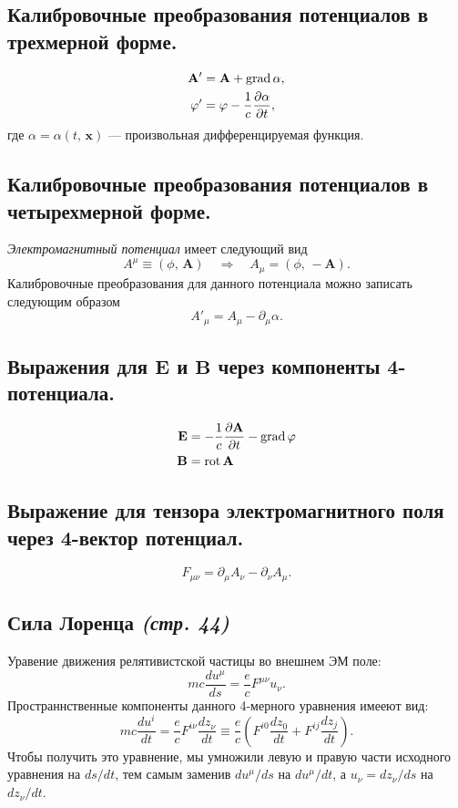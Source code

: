 \documentclass[a4paper,12pt]{article}
\begin{document}
\subsection{Калибровочные преобразования потенциалов в трехмерной форме.}
\begin{align*}
	\mathbf{A}'&=\mathbf{A}+\operatorname{grad} \alpha,\\
	\varphi'&=\varphi-\frac{1}{c}\frac{\partial \alpha}{\partial t} 
,\end{align*}
где $\alpha=\alpha(t,\,\mathbf{x})$ --- произвольная дифференцируемая функция.
\subsection{Калибровочные преобразования потенциалов в четырехмерной форме.}
\emph{Электромагнитный  потенциал} имеет следующий вид
\[
	A^\mu\equiv(\phi,\,\mathbf{A})\quad \Rightarrow\quad A_\mu=(\phi,\,-\mathbf{A})
.\]
Калибровочные преобразования для данного потенциала можно записать следующим
образом
\[
A'_\mu=A_\mu-\partial_\mu \alpha
.\] 
\subsection{Выражения для $\mathbf{E}$ и $\mathbf{B}$ через компоненты 4-потенциала.}
\begin{align*}
	\mathbf{E}&=-\frac{1}{c}\frac{\partial \mathbf{A}}{\partial t} -
	\operatorname{grad} \varphi\\
	\mathbf{B}&=\operatorname{rot} \mathbf{A}
\end{align*}
\subsection{Выражение для тензора электромагнитного поля через 4-вектор
потенциал.}
\[
F_{\mu\nu}=\partial_\mu A_\nu -\partial_\nu A_\mu
.\] 
\subsection{Сила Лоренца \emph{(стр. 44)}}
Уравение движения релятивистской частицы во внешнем ЭМ поле:
\[
	mc \frac{du^\mu}{ds}=\frac{e}{c}F^{\mu\nu}u_{\nu}
.\]
Пространнственные компоненты данного 4-мерного уравнения имееют вид:
\[
mc \frac{du^i}{dt}=\frac{e}{c}F^{i\nu} \frac{dz_\nu}{dt}\equiv
\frac{e}{c}\left( F^{i0} \frac{dz_0}{dt}+F^{ij}\frac{dz_j}{dt} \right) 
.\]
Чтобы получить это уравнение, мы умножили левую и правую части исходного
уравнения на $ds /dt$, тем  самым заменив  $du^\mu /ds$ на  $du^\mu/dt$, а
$u_\nu=dz_\nu /ds$ на  $dz_\nu /dt$.
\end{document}
